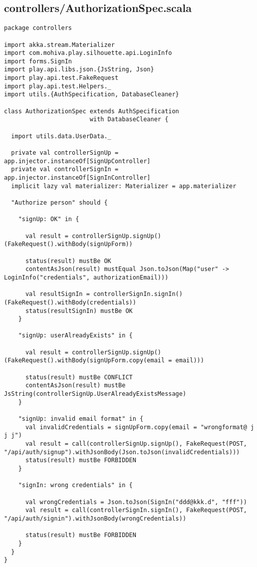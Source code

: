 \subsection{controllers/AuthorizationSpec.scala}
\begin{lstlisting}
package controllers

import akka.stream.Materializer
import com.mohiva.play.silhouette.api.LoginInfo
import forms.SignIn
import play.api.libs.json.{JsString, Json}
import play.api.test.FakeRequest
import play.api.test.Helpers._
import utils.{AuthSpecification, DatabaseCleaner}

class AuthorizationSpec extends AuthSpecification
                        with DatabaseCleaner {

  import utils.data.UserData._

  private val controllerSignUp = app.injector.instanceOf[SignUpController]
  private val controllerSignIn = app.injector.instanceOf[SignInController]
  implicit lazy val materializer: Materializer = app.materializer

  "Authorize person" should {

    "signUp: OK" in {

      val result = controllerSignUp.signUp()(FakeRequest().withBody(signUpForm))

      status(result) mustBe OK
      contentAsJson(result) mustEqual Json.toJson(Map("user" -> LoginInfo("credentials", authorizationEmail)))

      val resultSignIn = controllerSignIn.signIn()(FakeRequest().withBody(credentials))
      status(resultSignIn) mustBe OK
    }

    "signUp: userAlreadyExists" in {

      val result = controllerSignUp.signUp()(FakeRequest().withBody(signUpForm.copy(email = email)))

      status(result) mustBe CONFLICT
      contentAsJson(result) mustBe JsString(controllerSignUp.UserAlreadyExistsMessage)
    }

    "signUp: invalid email format" in {
      val invalidCredentials = signUpForm.copy(email = "wrongformat@ j j j")
      val result = call(controllerSignUp.signUp(), FakeRequest(POST, "/api/auth/signup").withJsonBody(Json.toJson(invalidCredentials)))
      status(result) mustBe FORBIDDEN
    }

    "signIn: wrong credentials" in {

      val wrongCredentials = Json.toJson(SignIn("ddd@kkk.d", "fff"))
      val result = call(controllerSignIn.signIn(), FakeRequest(POST, "/api/auth/signin").withJsonBody(wrongCredentials))

      status(result) mustBe FORBIDDEN
    }
  }
}
\end{lstlisting}
